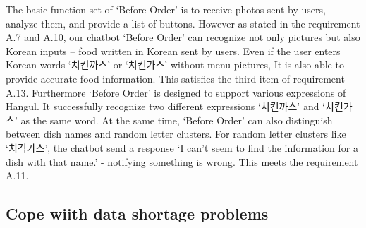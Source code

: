 The basic function set of ‘Before Order’ is to receive photos sent by users, analyze them, and provide a list of buttons. However as stated in the requirement A.7 and A.10, our chatbot ‘Before Order’ can recognize not only pictures but also Korean inputs – food written in Korean sent by users. Even if the user enters Korean words ‘치킨까스’ or ‘치킨가스’ without menu pictures, It is also able to provide accurate food information. This satisfies the third item of requirement A.13. Furthermore ‘Before Order’ is designed to support various expressions of Hangul. It successfully recognize two different expressions ‘치킨까스’ and ‘치킨가스’ as the same word. At the same time, ‘Before Order’ can also distinguish between dish names and random letter clusters. For random letter clusters like ‘치긱가스’, the chatbot send a response ‘I can’t seem to find the information for a dish with that name.’ - notifying something is wrong. This meets the requirement A.11.

\subsection{Cope wiith data shortage problems}

